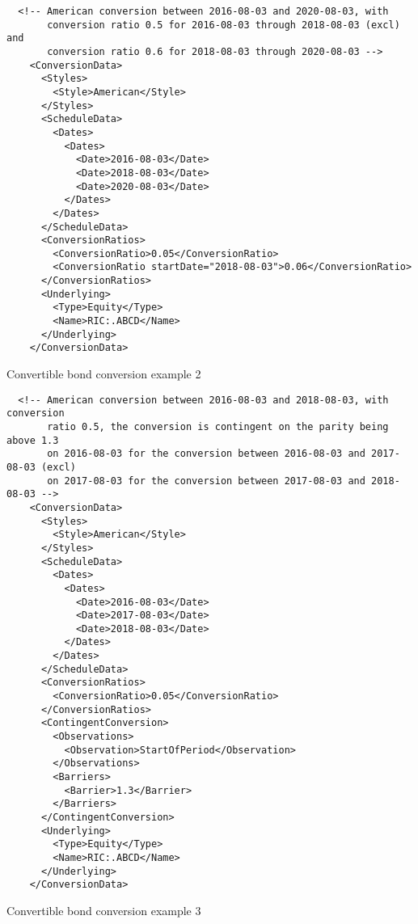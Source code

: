 \begin{listing}[H]
\begin{verbatim}
  <!-- American conversion between 2016-08-03 and 2020-08-03, with
       conversion ratio 0.5 for 2016-08-03 through 2018-08-03 (excl) and
       conversion ratio 0.6 for 2018-08-03 through 2020-08-03 -->
    <ConversionData>
      <Styles>
        <Style>American</Style>
      </Styles>
      <ScheduleData>
        <Dates>
          <Dates>
            <Date>2016-08-03</Date>
            <Date>2018-08-03</Date>
            <Date>2020-08-03</Date>
          </Dates>
        </Dates>
      </ScheduleData>
      <ConversionRatios>
        <ConversionRatio>0.05</ConversionRatio>
        <ConversionRatio startDate="2018-08-03">0.06</ConversionRatio>
      </ConversionRatios>
      <Underlying>
        <Type>Equity</Type>
        <Name>RIC:.ABCD</Name>
      </Underlying>
    </ConversionData>
\end{verbatim}
\caption{Convertible bond conversion example 2}
\label{lst:convertiblebonddata_conversion_2}
\end{listing}

\begin{listing}[H]
\begin{verbatim}
  <!-- American conversion between 2016-08-03 and 2018-08-03, with conversion
       ratio 0.5, the conversion is contingent on the parity being above 1.3
       on 2016-08-03 for the conversion between 2016-08-03 and 2017-08-03 (excl)
       on 2017-08-03 for the conversion between 2017-08-03 and 2018-08-03 -->
    <ConversionData>
      <Styles>
        <Style>American</Style>
      </Styles>
      <ScheduleData>
        <Dates>
          <Dates>
            <Date>2016-08-03</Date>
            <Date>2017-08-03</Date>
            <Date>2018-08-03</Date>
          </Dates>
        </Dates>
      </ScheduleData>
      <ConversionRatios>
        <ConversionRatio>0.05</ConversionRatio>
      </ConversionRatios>
      <ContingentConversion>
        <Observations>
          <Observation>StartOfPeriod</Observation>
        </Observations>
        <Barriers>
          <Barrier>1.3</Barrier>
        </Barriers>
      </ContingentConversion>
      <Underlying>
        <Type>Equity</Type>
        <Name>RIC:.ABCD</Name>
      </Underlying>
    </ConversionData>
\end{verbatim}
\caption{Convertible bond conversion example 3}
\label{lst:convertiblebonddata_conversion_3}
\end{listing}

